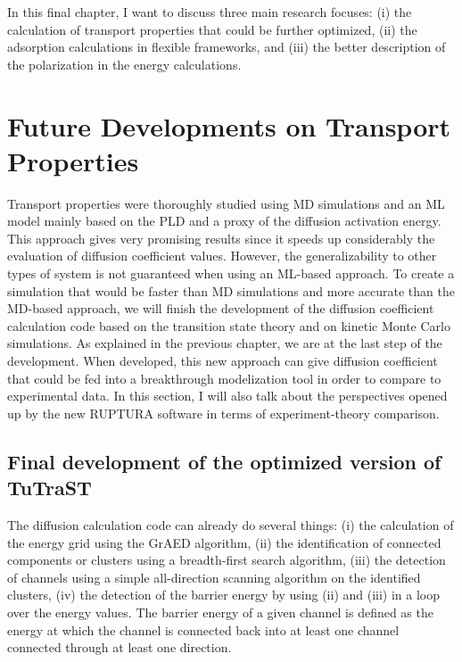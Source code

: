 \documentclass[main]{subfiles}
\begin{document}
In this final chapter, I want to discuss three main research focuses: (i) the calculation of transport properties that could be further optimized, (ii) the adsorption calculations in flexible frameworks, and (iii) the better description of the polarization in the energy calculations.

\section{Future Developments on Transport Properties}

Transport properties were thoroughly studied using MD simulations and an ML model mainly based on the PLD and a proxy of the diffusion activation energy. This approach gives very promising results since it speeds up considerably the evaluation of diffusion coefficient values. However, the generalizability to other types of system is not guaranteed when using an ML-based approach. To create a simulation that would be faster than MD simulations and more accurate than the MD-based approach, we will finish the development of the diffusion coefficient calculation code based on the transition state theory and on kinetic Monte Carlo simulations. As explained in the previous chapter, we are at the last step of the development. When developed, this new approach can give diffusion coefficient that could be fed into a breakthrough modelization tool in order to compare to experimental data. In this section, I will also talk about the perspectives opened up by the new RUPTURA software in terms of experiment-theory comparison.

\subsection{Final development of the optimized version of TuTraST}

The diffusion calculation code can already do several things: (i) the calculation of the energy grid using the GrAED algorithm, (ii) the identification of connected components or clusters using a breadth-first search algorithm, (iii)
the detection of channels using a simple all-direction scanning algorithm on the identified clusters, (iv) the detection of the barrier energy by using (ii) and (iii) in a loop over the energy values. The barrier energy of a given channel is defined as the energy at which the channel is connected back into at least one channel connected through at least one direction. 
\end{document}
